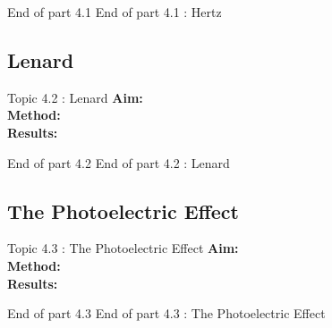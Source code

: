 %  
\begin{frame}{}
\small

\end{frame}

 \begin{frame}{End of part 4.1}
 End of part 4.1 : Hertz\\[1ex]

\end{frame}



\subsection{Lenard}

\begin{frame}{Topic 4.2 : Lenard}
\small
\textbf{Aim:}\\
\textbf{Method:}\\
\textbf{Results:}\\
\end{frame}


\begin{frame}{}
\small

\end{frame}


 \begin{frame}{End of part 4.2}
End of part 4.2 : Lenard\\[1ex]

\end{frame}



\subsection{The Photoelectric Effect}


\begin{frame}{Topic 4.3 : The Photoelectric Effect}
\small
\textbf{Aim:}\\
\textbf{Method:}\\
\textbf{Results:}\\
\end{frame}


\begin{frame}{}
\small

\end{frame}


 \begin{frame}{End of part 4.3}
End of part 4.3 : The Photoelectric Effect\\[1ex]

\end{frame}



 
